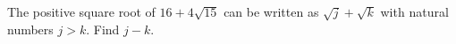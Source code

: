 The positive square root of $16+4\sqrt{15}$ can be written as $\sqrt j+\sqrt k$ with natural numbers $j>k$. Find $j-k$.
